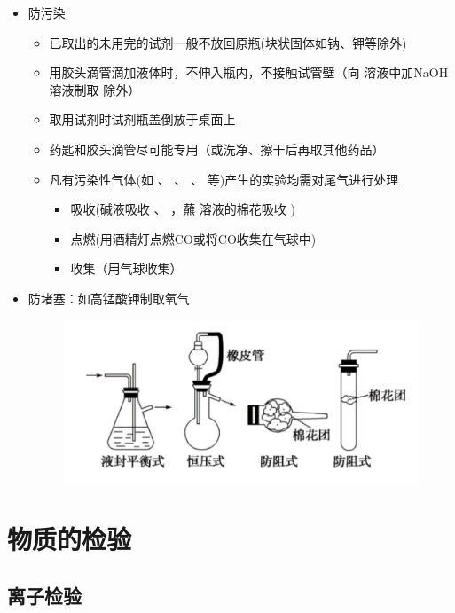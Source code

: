 \documentclass[10pt]{article}
\begin{document}
\begin{itemize}
\begin{figure}[h]
		\end{figure}
		\item 防污染
		\begin{itemize}
			\item 已取出的未用完的试剂一般不放回原瓶(块状固体如钠、钾等除外)
			\item 用胶头滴管滴加液体时，不伸入瓶内，不接触试管壁（向 溶液中加NaOH溶液制取 除外）
			\item 取用试剂时试剂瓶盖倒放于桌面上
			\item 药匙和胶头滴管尽可能专用（或洗净、擦干后再取其他药品）
			\item 凡有污染性气体(如 、 、 、 等)产生的实验均需对尾气进行处理
				\begin{itemize}
				\item 吸收(碱液吸收 、 ，蘸 溶液的棉花吸收 )
				\item 点燃(用酒精灯点燃CO或将CO收集在气球中)
				\item 收集（用气球收集）
				\end{itemize}
			\end{itemize}
			\item 防堵塞：如高锰酸钾制取氧气
			\begin{figure}[h]
			 \centering
			\includegraphics[scale=0.4]{res/Congestion.pdf}
			\end{figure}
	\end{itemize}
	
	
	
	\clearpage
	\section{物质的检验}
	
	
	\subsection{离子检验}
	
\end{document}
